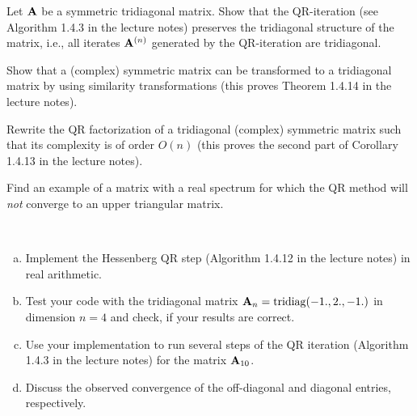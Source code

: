 
\begin{Sheet}
  \label{sheet4}

  \begin{Problem}
    Let $\mathbf A$ be a symmetric tridiagonal matrix. Show that the
    QR-iteration (see Algorithm 1.4.3 in the lecture notes) preserves
    the tridiagonal structure of the matrix, i.e., all iterates
    $\mathbf A^{(n)}$ generated by the QR-iteration are tridiagonal.
  \end{Problem}

  \begin{Problem}
    Show that a (complex) symmetric matrix can be transformed to a
    tridiagonal matrix by using similarity transformations (this
    proves Theorem 1.4.14 in the lecture notes).
  \end{Problem}

  \begin{Problem}
    Rewrite the QR factorization of a tridiagonal (complex) symmetric
    matrix such that its complexity is of order $O(n)$ (this proves
    the second part of Corollary 1.4.13 in the lecture notes).
  \end{Problem}

  \begin{Problem}
    Find an example of a matrix with a real spectrum for which the QR
    method will \textit{not} converge to an upper triangular matrix.
  \end{Problem}

  \begin{Problem}[Programming]
    \hfill\\\vspace{-6ex}
    \begin{enumerate}[(a)]
    \item Implement the Hessenberg QR step (Algorithm 1.4.12 in the
      lecture notes) in real arithmetic.
    \item Test your code with the tridiagonal matrix
      $\mathbf A_n=\operatorname{tridiag}(-1.,2.,-1.)$ in dimension $n=4$
      and check, if your results are correct.
    \item Use your implementation to run several steps of the QR
      iteration (Algorithm 1.4.3 in the lecture notes) for the matrix
      $\mathbf A_{10}$.
    \item Discuss the observed convergence of the off-diagonal and
      diagonal entries, respectively.
    \end{enumerate}
  \end{Problem}

\end{Sheet}


